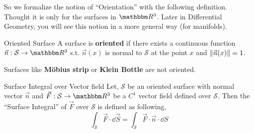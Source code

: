 \documentclass[../Analysis-3]{subfiles}
\begin{document}
So we formalize the notion of ``Orientation'' with the following definition. Thought it is only for the surfaces in $ \R^3 $. Later in Differential Geometry, you will see this notion in a more general way (for manifolds).

\begin{Def}{Oriented Surface}{}
    A surface is \textbf{oriented} if there exists a continuous function $\vec{n} : \mathcal{S} \to \R^3$ s.t. $\vec{n}(x)$ is normal to $\mathcal{S}$ at the point $x$ and $\norm{\vec{n}(x)} = 1$.
\end{Def}

Surfaces like \textbf{Möbius strip} or \textbf{Klein Bottle} are not oriented.

\begin{Def}{Surface Integral over Vector field}{}
    Let, $\mathcal{S}$ be an oriented surface with normal vector $\vec{n}$ and $\vec{F} : \mathcal{S} \to \R^3$ be a $C^1$ vector field defined over $\mathcal{S}$. Then the ``Surface Integral'' of $\vec{F}$ over $\mathcal{S}$ is defined as following,
    \[ \int_{\mathcal{S}} \vec{F} \cdot \dd \vec{S} = \int_{\mathcal{S}} \vec{F}\cdot\vec{n} \cdot \dd S \]
\end{Def}


\end{document}
